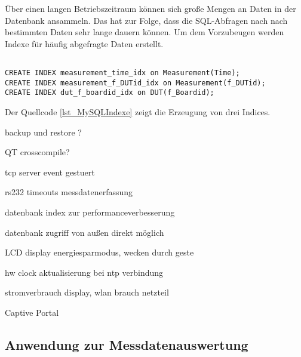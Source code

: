 Über einen langen Betriebszeitraum können sich große Mengen an Daten in der Datenbank ansammeln. Das hat zur Folge, dass die SQL-Abfragen nach nach bestimmten Daten sehr lange dauern können. Um dem Vorzubeugen werden Indexe für häufig abgefragte Daten erstellt.\\

\begin{lstlisting}[caption={MySQL Indexe},label=lst_MySQLIndexe]

CREATE INDEX measurement_time_idx on Measurement(Time);
CREATE INDEX measurement_f_DUTid_idx on Measurement(f_DUTid);
CREATE INDEX dut_f_boardid_idx on DUT(f_Boardid);
\end{lstlisting}


Der Quellcode \ref{lst_MySQLIndexe} zeigt die Erzeugung von drei Indices.








backup und restore ?

QT crosscompile?

tcp server event gestuert

rs232 timeouts messdatenerfassung

datenbank index zur performanceverbesserung

datenbank zugriff von außen direkt möglich

LCD display energiesparmodus, wecken durch geste


hw clock aktualisierung bei ntp verbindung


stromverbrauch display, wlan brauch netzteil

Captive Portal




\subsection{Anwendung zur Messdatenauswertung}